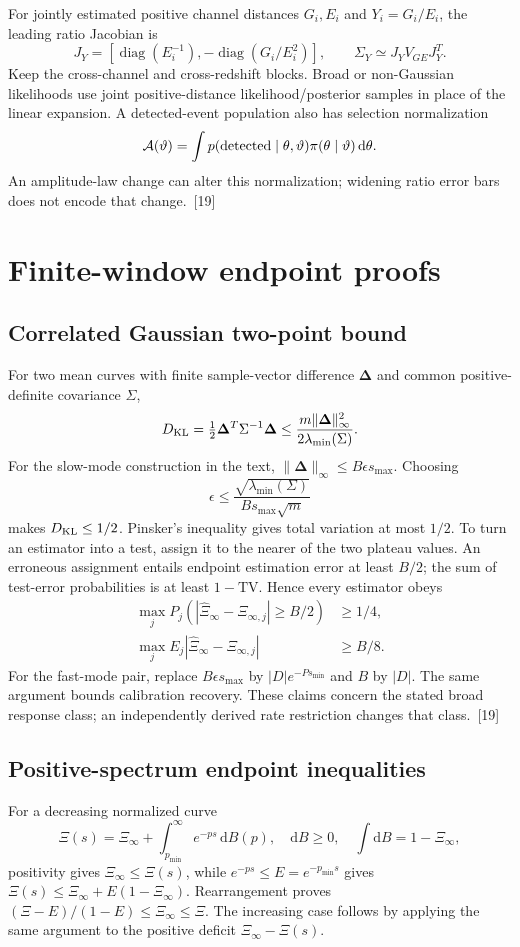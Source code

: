 \documentclass[10pt,twocolumn,letterpaper]{article}
\newcommand{\dd}{\mathrm{d}}
\newcommand{\diag}{\operatorname{diag}}
\begin{document}
For jointly estimated positive channel distances $G_i,E_i$ and $Y_i=G_i/E_i$, the leading ratio Jacobian is
\[
 J_Y=\left[\diag(E_i^{-1}),-\diag(G_i/E_i^2)\right],\qquad
 \Sigma_Y\simeq J_YV_{GE}J_Y^T.
\]
Keep the cross-channel and cross-redshift blocks. Broad or non-Gaussian likelihoods use joint positive-distance likelihood/posterior samples in place of the linear expansion. A detected-event population also has selection normalization
\[
 \mathcal A(\vartheta)=\int p({\rm detected}\mid\theta,\vartheta)
 \pi(\theta\mid\vartheta)\,\dd\theta.
\]
An amplitude-law change can alter this normalization; widening ratio error bars does not encode that change.~[19]

\section{Finite-window endpoint proofs}\label{app:minimax}
\subsection{Correlated Gaussian two-point bound}
For two mean curves with finite sample-vector difference $\bm\Delta$ and common positive-definite covariance $\Sigma$,
\[
 D_{\rm KL}=\tfrac 12\bm\Delta^T\Sigma^{-1}\bm\Delta
 \le\frac{m\|\bm\Delta\|_\infty^2}{2\lambda_{\min}(\Sigma)}.
\]
For the slow-mode construction in the text, $\|\bm\Delta\|_\infty\le B\epsilon s_{\max}$. Choosing
\[
 \epsilon\le\frac{\sqrt{\lambda_{\min}(\Sigma)}}{B s_{\max}\sqrt m}
\]
makes $D_{\rm KL}\le 1/2$. Pinsker's inequality gives total variation at most $1/2$. To turn an estimator into a test, assign it to the nearer of the two plateau values. An erroneous assignment entails endpoint estimation error at least $B/2$; the sum of test-error probabilities is at least $1-\mathrm{TV}$. Hence every estimator obeys
\[
\begin{aligned}
 \max_jP_j(|\widehat \Xi_\infty-\Xi_{\infty,j}|\ge B/2)&\ge 1/4,\\
 \max_jE_j|\widehat \Xi_\infty-\Xi_{\infty,j}|&\ge B/8.
\end{aligned}
\]
For the fast-mode pair, replace $B\epsilon s_{\max}$ by $|D|e^{-Ps_{\min}}$ and $B$ by $|D|$. The same argument bounds calibration recovery. These claims concern the stated broad response class; an independently derived rate restriction changes that class.~[19]

\subsection{Positive-spectrum endpoint inequalities}
For a decreasing normalized curve
\[
 \Xi(s)=\Xi_\infty+\int_{p_{\min}}^\infty e^{-ps}\,\dd B(p),\quad
 \dd B\ge 0,\quad\int\dd B=1-\Xi_\infty,
\]
positivity gives $\Xi_\infty\le \Xi(s)$, while $e^{-ps}\le E=e^{-p_{\min}s}$ gives $\Xi(s)\le \Xi_\infty+E(1-\Xi_\infty)$. Rearrangement proves $(\Xi-E)/(1-E)\le \Xi_\infty\le\Xi$. The increasing case follows by applying the same argument to the positive deficit $\Xi_\infty-\Xi(s)$.
\end{document}
